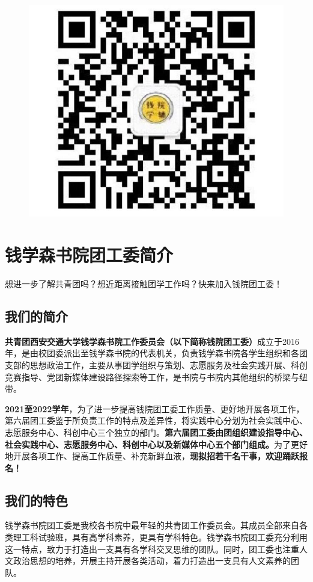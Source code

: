 \documentclass[
decoration,  %
]{qyxf-book}
\begin{document}
	\begin{figure}[H]
		\centering
		\includegraphics[]{33333333333.png}
	\end{figure}
	
	\section{钱学森书院团工委简介}
	想进一步了解共青团吗？想近距离接触团学工作吗？快来加入钱院团工委！
	
	\subsection{我们的简介}
	
	\textbf{共青团西安交通大学钱学森书院工作委员会（以下简称钱院团工委）}成立于2016年，是由校团委派出至钱学森书院的代表机关，负责钱学森书院各学生组织和各团支部的思想政治工作，主要从事团学组织与策划、志愿服务及社会实践开展、科创竞赛指导、党团新媒体建设路径探索等工作，是书院与书院内其他组织的桥梁与纽带。
	
	\textbf{2021至2022学年}，为了进一步提高钱院团工委工作质量、更好地开展各项工作，第六届团工委鉴于所负责工作的特点及差异性，将实践中心分划为社会实践中心、志愿服务中心、科创中心三个独立的部门。\textbf{第六届团工委由团组织建设指导中心、社会实践中心、志愿服务中心、科创中心以及新媒体中心五个部门组成。}为了更好地开展各项工作、提高工作质量、补充新鲜血液，\textbf{现拟招若干名干事，欢迎踊跃报名！}
	
	\subsection{我们的特色}
	钱学森书院团工委是我校各书院中最年轻的共青团工作委员会。其成员全部来自各类理工科试验班，具有高学科素养，更具有学科特色。钱学森书院团工委充分利用这一特点，致力于打造出一支具有各学科交叉思维的团队。同时，团工委也注重人文政治思想的培养，开展主持开展各类活动，着力打造出一支具有人文素养的团队。
	
\end{document}
